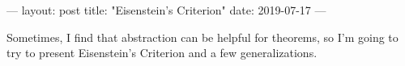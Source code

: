 ---
layout: post
title: "Eisenstein's Criterion"
date: 2019-07-17
---

Sometimes, I find that abstraction can be helpful for theorems, so I'm going to try to present Eisenstein's Criterion and a few generalizations.


